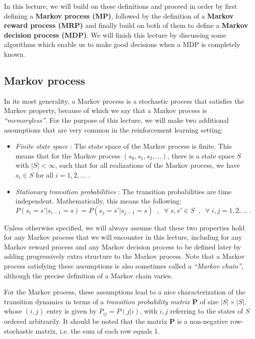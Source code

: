 \documentclass{article}
\theoremstyle{definition}
\theoremstyle{remark}
\begin{document}
In this lecture, we will build on these definitions and proceed in order by first defining a \textbf{Markov process (MP)}, followed by the definition of a \textbf{Markov reward process (MRP)} and finally build on both of them to define a \textbf{Markov decision process (MDP)}. We will finish this lecture by discussing some algorithms which enable us to make good decisions when a MDP is completely known.

\subsection{Markov process}
In its most generality, a Markov process is a stochastic process that satisfies the Markov property, because of which we say that a Markov process is \textit{``memoryless''}. For the purpose of this lecture, we will make two additional assumptions that are very common in the reinforcement learning setting:

\begin{itemize}
\item \textit{Finite state space} : The state space of the Markov process is finite. This means that for the Markov process $(s_0, s_1, s_2, \dots)$, there is a state space $S$ with $|S| < \infty$, such that for all realizations of the Markov process, we have $s_i \in S$ for all $i = 1,2,\dots$ .
\item \textit{Stationary transition probabilities} : The transition probabilities are time independent. Mathematically, this means the following:
\begin{equation}
P(s_i = s' | s_{i-1} = s) = P(s_j = s' | s_{j-1} = s) \;\;,\;\; \forall \; s,s' \in S \;\;,\;\; \forall \; i,j = 1,2,\dots \;.
\label{eq:stationary_def}
\end{equation}
\end{itemize}
Unless otherwise specified, we will always assume that these two properties hold for any Markov process that we will encounter in this lecture, including for any Markov reward process and any Markov decision process to be defined later by adding progressively extra structure to the Markov process. Note that a Markov process satisfying these assumptions is also sometimes called a \textit{``Markov chain''}, although the precise definition of a Markov chain varies.

For the Markov process, these assumptions lead to a nice characterization of the transition dynamics in terms of a \textit{transition probability matrix} $\mathbf{P}$ of size $|S|\times|S|$, whose $(i,j)$ entry is given by $P_{ij}=P(j|i)$, with $i,j$ referring to the states of $S$ ordered arbitrarily. It should be noted that the matrix $\mathbf{P}$ is a non-negative row-stochastic matrix, i.e. the sum of each row equals 1.
\end{document}
